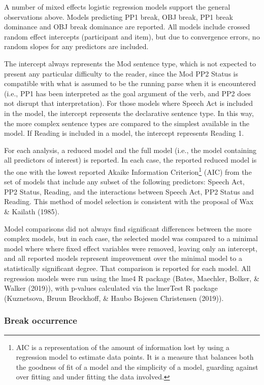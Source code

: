 \documentclass[12pt,oneside]{book}
\let\rmarkdownfootnote\footnote%
\def\footnote{\protect\rmarkdownfootnote}
\begin{document}
A number of mixed effects logistic regression models support the general observations above. Models predicting PP1 break, OBJ break, PP1 break dominance and OBJ break dominance are reported. All models include crossed random effect intercepts (participant and item), but due to convergence errors, no random slopes for any predictors are included.

The intercept always represents the Mod sentence type, which is not expected to present any particular difficulty to the reader, since the Mod PP2 Status is compatible with what is assumed to be the running parse when it is encountered (i.e., PP1 has been interpreted as the goal argument of the verb, and PP2 does not disrupt that interpretation). For those models where Speech Act is included in the model, the intercept represents the declarative sentence type. In this way, the more complex sentence types are compared to the simplest available in the model. If Reading is included in a model, the intercept represents Reading 1.

For each analysis, a reduced model and the full model (i.e., the model containing all predictors of interest) is reported. In each case, the reported reduced model is the one with the lowest reported Akaike Information Criterion\footnote{AIC is a representation of the amount of information lost by using a regression model to estimate data points. It is a measure that balances both the goodness of fit of a model and the simplicity of a model, guarding against over fitting and under fitting the data involved.} (AIC) from the set of models that include any subset of the following predictors: Speech Act, PP2 Status, Reading, and the interactions between Speech Act, PP2 Status and Reading. This method of model selection is consistent with the proposal of Wax \& Kailath (1985).

Model comparisons did not always find significant differences between the more complex models, but in each case, the selected model was compared to a minimal model where where fixed effect variables were removed, leaving only an intercept, and all reported models represent improvement over the minimal model to a statistically significant degree. That comparison is reported for each model. All regression models were run using the lme4 R package (Bates, Maechler, Bolker, \& Walker (2019)), with p-values calculated via the lmerTest R package (Kuznetsova, Bruun Brockhoff, \& Haubo Bojesen Christensen (2019)).

\hypertarget{break-occurrence}{%
\subsubsection{Break occurrence}\label{break-occurrence}}
\end{document}
